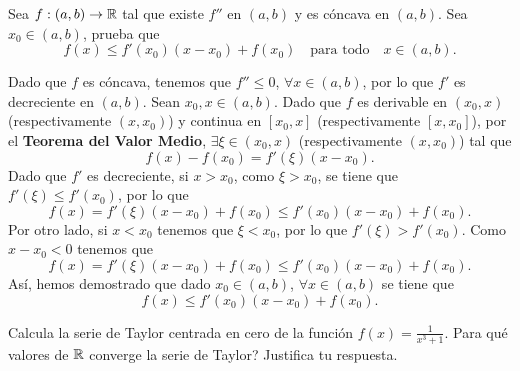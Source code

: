 \documentclass{article}
\begin{document}
\begin{ej}
Sea $\displaystyle f : \left(a,b\right) \to \mathbb{R} $ tal que existe $\displaystyle f'' $ en $\displaystyle \left(a,b\right) $ y es cóncava en $\displaystyle \left(a,b\right) $. Sea $\displaystyle x_{0} \in \left(a,b\right) $, prueba que 
\[f\left(x\right) \leq f'\left(x_{0}\right)\left(x-x_{0}\right) + f\left(x_{0}\right) \quad \text{para todo} \quad x \in \left(a,b\right) .\]
\end{ej}
\begin{sol}
Dado que $\displaystyle f $ es cóncava, tenemos que $\displaystyle f'' \leq 0 $, $\displaystyle \forall x \in \left(a,b\right) $, por lo que $\displaystyle f' $ es decreciente en $\displaystyle \left(a,b\right) $. Sean $\displaystyle x_{0},x \in \left(a,b\right) $. 
Dado que $\displaystyle f $ es derivable en $\displaystyle \left(x_{0}, x\right) $ (respectivamente $\displaystyle \left(x, x_{0}\right) $) y continua en $\displaystyle \left[x_{0}, x\right]  $ (respectivamente $\displaystyle \left[x, x_{0}\right]  $), por el \textbf{Teorema del Valor Medio}, $\displaystyle \exists \xi \in \left(x_{0}, x\right) $ (respectivamente $\displaystyle \left(x, x_{0}\right) $) tal que 
\[f\left(x\right)-f\left(x_{0}\right) = f'\left(\xi\right)\left(x-x_{0}\right) .\]
Dado que $\displaystyle f' $ es decreciente, si $\displaystyle x > x_{0} $, como $\displaystyle \xi > x_{0} $, se tiene que $\displaystyle f'\left(\xi\right) \leq f'\left(x_{0}\right) $, por lo que
\[f\left(x\right) = f'\left(\xi\right)\left(x-x_{0}\right)+f\left(x_{0}\right) \leq f'\left(x_{0}\right)\left(x-x_{0}\right)+f\left(x_{0}\right) .\]
Por otro lado, si $\displaystyle x < x_{0} $ tenemos que $\displaystyle \xi < x_{0} $, por lo que $\displaystyle f'\left(\xi\right) > f'\left(x_{0}\right) $. Como $\displaystyle x - x_{0} < 0 $ tenemos que 
\[f\left(x\right) = f'\left(\xi\right)\left(x-x_{0}\right)+f\left(x_{0}\right) \leq f'\left(x_{0}\right)\left(x-x_{0}\right)+f\left(x_{0}\right) .\]
Así, hemos demostrado que dado $\displaystyle x_{0} \in \left(a,b\right) $, $\displaystyle \forall x \in \left(a,b\right) $ se tiene que 
\[f\left(x\right) \leq f'\left(x_{0}\right)\left(x-x_{0}\right)+f\left(x_{0}\right) .\]
\end{sol}
\begin{ej}
Calcula la serie de Taylor centrada en cero de la función $\displaystyle f\left(x\right) = \frac{1}{x^{3}+1} $. Para qué valores de $\displaystyle \mathbb{R} $ converge la serie de Taylor? Justifica tu respuesta.
\end{ej}
\end{document}
